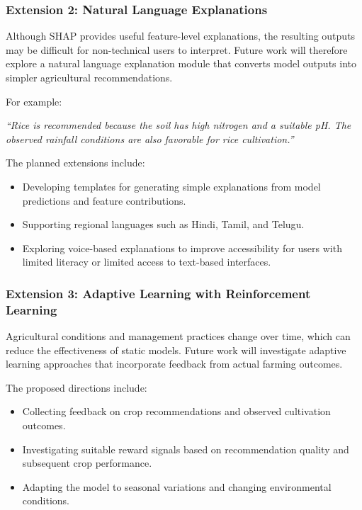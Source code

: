 \documentclass[journal]{IEEEtran}
\begin{document}
\subsubsection{Extension 2: Natural Language Explanations}

Although SHAP provides useful feature-level explanations, the resulting outputs may be difficult for non-technical users to interpret. Future work will therefore explore a natural language explanation module that converts model outputs into simpler agricultural recommendations.

For example:

\emph{``Rice is recommended because the soil has high nitrogen and a suitable pH. The observed rainfall conditions are also favorable for rice cultivation.''}

The planned extensions include:

\begin{itemize}[leftmargin=1.2em]
    \item Developing templates for generating simple explanations from model predictions and feature contributions.

    \item Supporting regional languages such as Hindi, Tamil, and Telugu.

    \item Exploring voice-based explanations to improve accessibility for users with limited literacy or limited access to text-based interfaces.
\end{itemize}


\subsubsection{Extension 3: Adaptive Learning with Reinforcement Learning}

Agricultural conditions and management practices change over time, which can reduce the effectiveness of static models. Future work will investigate adaptive learning approaches that incorporate feedback from actual farming outcomes.

The proposed directions include:

\begin{itemize}[leftmargin=1.2em]
    \item Collecting feedback on crop recommendations and observed cultivation outcomes.

    \item Investigating suitable reward signals based on recommendation quality and subsequent crop performance.

    \item Adapting the model to seasonal variations and changing environmental conditions.
\end{itemize}
\end{document}
